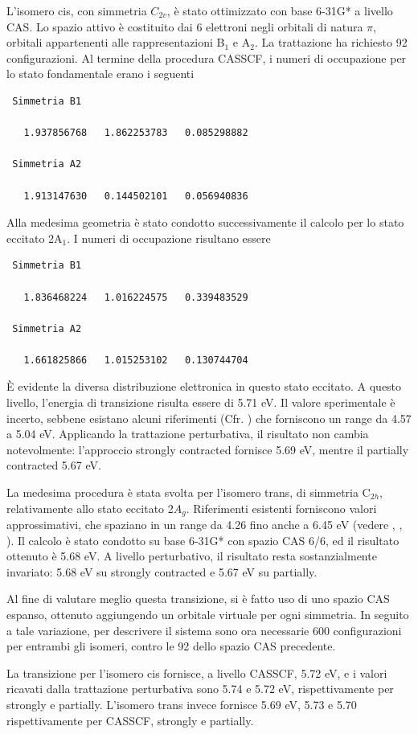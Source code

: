 L'isomero cis, con simmetria $C_{2v}$, \`e stato ottimizzato con base 6-31G*
a livello CAS. Lo spazio attivo \`e costituito dai 6 elettroni
negli orbitali di natura $\pi$, orbitali appartenenti alle rappresentazioni
B$_1$ e A$_2$. La trattazione ha richiesto 92 configurazioni.
Al termine della procedura CASSCF, i numeri di occupazione per lo stato
fondamentale erano i seguenti
\begin{verbatim}
 Simmetria B1

   1.937856768   1.862253783   0.085298882

 Simmetria A2

   1.913147630   0.144502101   0.056940836
\end{verbatim}

Alla medesima geometria \`e stato condotto successivamente il calcolo per lo
stato eccitato 2A$_1$. I numeri di occupazione risultano essere
\begin{verbatim}
 Simmetria B1

   1.836468224   1.016224575   0.339483529

 Simmetria A2

   1.661825866   1.015253102   0.130744704
\end{verbatim}

\`E evidente la diversa distribuzione elettronica in questo stato eccitato.
A questo livello, l'energia di transizione risulta essere di 5.71 eV. Il
valore sperimentale \`e incerto, sebbene esistano alcuni riferimenti
(Cfr. \cite{jcp-114-4-2001-1631}) che forniscono un range da 4.57 a 5.04 eV.
Applicando la trattazione perturbativa, il risultato non cambia
notevolmente: l'approccio strongly contracted fornisce 5.69 eV, mentre il
partially contracted 5.67 eV. 

La medesima procedura \`e stata svolta per l'isomero trans, di simmetria
C$_{2h}$, relativamente allo stato eccitato 2$A_g$. Riferimenti esistenti
forniscono valori approssimativi, che spaziano in un range da
4.26 fino anche a 6.45 eV (vedere \cite{pccp-3-2001-2567}, \cite{jcp-112-2-2000-613},
\cite{jcp-92-1990-4622}). Il calcolo \`e stato condotto su base 6-31G* con
spazio CAS 6/6, ed il risultato ottenuto \`e 5.68 eV. A livello perturbativo,
il risultato resta sostanzialmente invariato: 5.68 eV su strongly contracted e
5.67 eV su partially.

Al fine di valutare meglio questa transizione, si \`e fatto uso di uno spazio
CAS espanso, ottenuto aggiungendo un orbitale virtuale per ogni simmetria.
In seguito a tale variazione, per descrivere il sistema sono ora necessarie
600 configurazioni per entrambi gli isomeri, contro le 92 dello spazio CAS
precedente.

La transizione per l'isomero cis fornisce, a livello CASSCF, 5.72 eV, e i
valori ricavati dalla trattazione perturbativa sono 5.74 e 5.72 eV, 
rispettivamente per strongly e partially.
L'isomero trans invece fornisce 5.69 eV, 5.73 e 5.70 rispettivamente per
CASSCF, strongly e partially.
